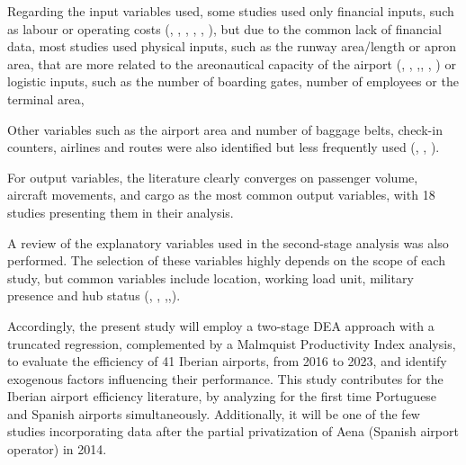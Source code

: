 Regarding the input variables used, some studies used only financial inputs, such as labour or operating costs (\cite{martin2001}, \cite{barros2008}, \cite{barrosdieke2008}, \cite{coto-millan2014}, \cite{coto-millan2016}, \cite{inglada2018}), but due to the common lack of financial data, most studies used physical inputs, such as the runway area/length or apron area, that are more related to the areonautical capacity of the airport (\cite{lin2006}, \cite{barros2008b}, \cite{tsekeris2011},\cite{lozano2013}, \cite{fragoudaki2016}, \cite{gutierrez2016}) or logistic inputs, such as the number of boarding gates, number of employees or the terminal area, 

Other variables such as the airport area and number of baggage belts, check-in counters, airlines and routes were also identified but less frequently used (\cite{lozano2013}, \cite{gutierrez2016}, \cite{cifuentes-faura2023}). 

For output variables, the literature clearly converges
on passenger volume, aircraft movements, and cargo as the most common output variables, with 18 studies presenting them in their analysis.

A review of the explanatory variables used in the second-stage analysis was also performed. The selection of these variables highly depends on the scope of each study, but common variables include location, working load unit, military presence and hub status (\cite{barrosdieke2008}, \cite{barros2008b}, \cite{tsekeris2011},\cite{adler2013},\cite{fragoudaki2016}). 

Accordingly, the present study will employ a two-stage DEA approach with a truncated regression, complemented by a Malmquist Productivity Index analysis, to evaluate the efficiency of 41 Iberian airports, from 2016 to 2023, and identify exogenous factors influencing their performance. 
This study contributes for the Iberian airport efficiency literature, by analyzing for the first time Portuguese and Spanish airports simultaneously. Additionally, it will be one of the few studies incorporating data after the partial privatization of Aena (Spanish airport operator) in 2014. 